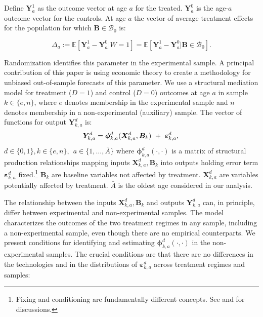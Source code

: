 Define $\bm{Y}^1_a$ as the outcome vector at age $a$ for the treated. $\bm{Y}^0_a$ is the age-$a$ outcome vector for the controls. At age $a$ the vector of average treatment effects for the population for which $\bm{B}\in\mathcal{B}_0$ is:

\begin{equation}
\Delta_a  := \mathbb{E} \left[ \bm{Y}^1_a - \bm{Y}^0_a | W = 1 \right] = \mathbb{E} \left[\bm{Y}^1_a - \bm{Y}^0_{a} | \bm{B} \in \mathcal{B}_0 \right]. \label{eq:mainte}
\end{equation}

Randomization identifies this parameter in the experimental sample. A principal contribution of this paper is using economic theory to create a methodology for unbiased out-of-sample forecasts of this parameter. We use a structural mediation model for treatment ($D=1$) and control ($D=0$) outcomes at age $a$ in sample $k \in \{e,n\}$, where $e$ denotes membership in the experimental sample and $n$ denotes membership in a non-experimental (auxiliary) sample. The vector of functions for output $\bm{Y}^d_{k,a}$ is:
\begin{equation}
\bm{Y}^d_{k,a} = \bm{\phi}^d_{k,a} (\bm{X}^d_{k,a}, \bm{B}_k) \ + \ \bm{\varepsilon}^d_{k,a},  \label{eq:outcome} \\
\end{equation}
$d \in\{0,1\},  k\in\{e,n\}, \ \ a\in\{1,\dots,\bar{A}\}$ where $\bm{\phi}^d_{k,a}\left( \cdot, \cdot \right)$ is a matrix of structural production relationships mapping inputs $\bm{X}^d_{k,a}, \bm{B}_k$ into outputs holding error term $\bm{\varepsilon}^d_{k,a}$ fixed.\footnote{Fixing and conditioning are fundamentally different concepts. See \cite{Haavelmo_1943_Econometrica} and \citet{Heckman_Pinto_2015_EconometTheory} for discussions.} $ \bm{B}_k$ are baseline variables not affected by treatment. $\bm{X}^d_{k,a}$ are variables potentially affected by treatment. $\bar{A}$ is the oldest age considered in our analysis.

The relationship between the inputs $\bm{X}^d_{k,a}, \bm{B}_k$ and outputs $\bm{Y}^d_{k,a}$ can, in principle, differ between experimental and non-experimental samples. The model characterizes the outcomes of the two treatment regimes in any sample, including a non-experimental sample, even though there are no empirical counterparts. We present conditions for identifying and estimating $\bm{\phi}^d_{k,a}\left( \cdot, \cdot \right)$ in the non-experimental samples. The crucial conditions are that there are no differences in the technologies and in the distributions of $\bm{\varepsilon}_{k,a}^d$ across treatment regimes and samples:

